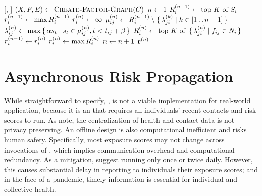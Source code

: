 \begin{function}[H]{\nRiskPropagation}[\vScores, \vContacts]
  \State $(\vVariables, \vFactors, \vEdges) \assign \cCreateFactorGraph[\vContacts]$
  \State $n \leftarrow 1$
  \ForEach{$\vVariable[i] \in \vVariables$}
    \State $R_{i}^{(n - 1)} \leftarrow \text{top } K \text{ of } S_i$
    \State $r_{i}^{(n - 1)} \leftarrow \max R_{i}^{(n - 1)}$
    \State $r_{i}^{(n)} \leftarrow \infty$
  \EndFor
    \ForEach{$\{\vVariable[i], \vFactor[ij]\} \in \vEdges$}
      \State $\mu_{ij}^{(n)} \leftarrow R_{i}^{(n - 1)} \setminus \set{ \lambda_{ji}^{(k)} | k \in [1 \mathinner {\ldotp \ldotp}n - 1]}$
    \EndFor
    \ForEach{$\{\vVariable[i], \vFactor[ij]\} \in \vEdges$}
      \State $\lambda_{ij}^{(n)} \leftarrow \max \set{ \alpha s_t | s_t \in \mu_{ij}^{(n)}, t < t_{ij} + \beta}$
    \EndFor
    \ForEach{$\vVariable[i] \in \vVariables$}
      \State $\vRiskScores{i}{n} \assign \topK{\setBuilder{\vFactorMessage{j}{i}{n}}{\vFactor[ij] \in \vNeighbors_i}}$
    \EndFor
    \ForEach{$\vVariable[i] \in \vVariables$}
      \State $r_{i}^{(n - 1)} \leftarrow r_{i}^{(n)}$
      \State $r_{i}^{(n)} \leftarrow \max R_{i}^{(n)}$
    \EndFor
    \State $n \leftarrow n + 1$
  \EndWhile
  \State \Return $\mathbf{r}^{(n)}$
\end{function}

\section{Asynchronous Risk Propagation}\label{sec:asynchronous}

While straightforward to specify, \cRiskPropagation{}, is not a viable implementation for real-world application, because it is an  that requires all individuals' recent contacts and risk scores to run. As \citet{Ayday2021} note, the centralization of health and contact data is not privacy preserving. An offline design is also computational inefficient and risks human safety. Specifically, most exposure scores may not change across invocations of \cRiskPropagation{}, which implies communication overhead and computational redundancy. As a mitigation, \citet{Ayday2020} suggest running \cRiskPropagation{} only once or twice daily. However, this causes substantial delay in reporting to individuals their exposure scores; and in the face of a pandemic, timely information is essential for individual and collective health.

